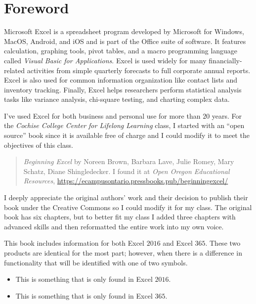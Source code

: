 \chapter*{Foreword}\label{ch:foreword}

Microsoft Excel is a spreadsheet program developed by Microsoft for Windows, MacOS, Android, and iOS and is part of the Office suite of software. It features calculation, graphing tools, pivot tables, and a macro programming language called \textit{Visual Basic for Applications}. Excel is used widely for many financially-related activities from simple quarterly forecasts to full corporate annual reports. Excel is also used for common information organization like contact lists and inventory tracking. Finally, Excel helps researchers perform statistical analysis tasks like variance analysis, chi-square testing, and charting complex data.

I've used Excel for both business and personal use for more than $ 20 $ years. For the \textit{Cochise College Center for Lifelong Learning} class, I started with an ``open source'' book since it is available free of charge and I could modify it to meet the objectives of this class.

\begin{quote}
	\textit{Beginning Excel} by Noreen Brown, Barbara Lave, Julie Romey, Mary Schatz, Diane Shingledecker. I found it at \textit{Open Oregon Educational Resources}, \url{https://ecampusontario.pressbooks.pub/beginningexcel/}
\end{quote}

I deeply appreciate the original authors' work and their decision to publish their book under the Creative Commons so I could modify it for my class. The original book has six chapters, but to better fit my class I added three chapters with advanced skills and then reformatted the entire work into my own voice.

This book includes information for both Excel $ 2016 $ and Excel $ 365 $. These two products are identical for the most part; however, when there is a difference in functionality that will be identified with one of two symbols. 

\begin{itemize}
	\item {} This is something that is only found in Excel $ 2016 $. 
	\item {} This is something that is only found in Excel $ 365 $.
\end{itemize}

